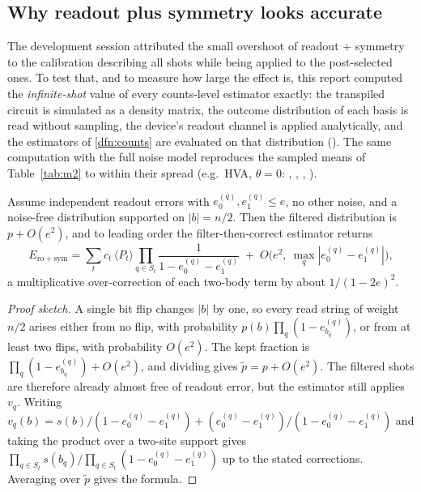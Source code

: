 \subsection{Why readout plus symmetry looks accurate}
\label{sec:m2cancel}

The development session attributed the small overshoot of readout + symmetry to the calibration
describing all shots while being applied to the post-selected ones. To test that, and to measure
how large the effect is, this report computed the \emph{infinite-shot} value of every
counts-level estimator exactly: the transpiled circuit is simulated as a density matrix, the
outcome distribution of each basis is read without sampling, the device's readout channel is
applied analytically, and the estimators of \cref{dfn:counts} are evaluated on that distribution
(). The same computation with the full noise model
reproduces the sampled means of Table~\ref{tab:m2} to within their spread (e.g.\ HVA, $\theta=0$:
\VMxHvaZeroFullRaw, \VMxHvaZeroFullRo, \VMxHvaZeroFullSym, \VMxHvaZeroFullRoSym).

\begin{prop}\label{prop:overcorrect}
  Assume independent readout errors with $e_0^{(q)},e_1^{(q)}\le e$, no other noise, and a
  noise-free distribution supported on $|b|=n/2$. Then the filtered distribution is
  $p+O(e^2)$, and to leading order the filter-then-correct estimator returns
  \[
    E_{\mathrm{ro+sym}}=\sum_t c_t\,\langle P_t\rangle\prod_{q\in S_t}\frac{1}{1-e_0^{(q)}-e_1^{(q)}}
      \;+\;O\bigl(e^2,\ \max_q|e_0^{(q)}-e_1^{(q)}|\bigr),
  \]
  a multiplicative over-correction of each two-body term by about $1/(1-2e)^2$.
\end{prop}

\begin{proof}[Proof sketch]
  A single bit flip changes $|b|$ by one, so every read string of weight $n/2$ arises either from
  no flip, with probability $p(b)\prod_q(1-e^{(q)}_{b_q})$, or from at least two flips, with
  probability $O(e^2)$. The kept fraction is $\prod_q(1-e_{b_q}^{(q)})+O(e^2)$, and dividing
  gives $\tilde p=p+O(e^2)$. The filtered shots are therefore already almost free of readout
  error, but the estimator still applies $v_q$. Writing
  $v_q(b)=s(b)/(1-e_0^{(q)}-e_1^{(q)})+(e_0^{(q)}-e_1^{(q)})/(1-e_0^{(q)}-e_1^{(q)})$ and taking
  the product over a two-site support gives
  $\prod_{q\in S_t}s(b_q)\big/\prod_{q\in S_t}(1-e_0^{(q)}-e_1^{(q)})$ up to the stated
  corrections. Averaging over $\tilde p$ gives the formula.
\end{proof}

